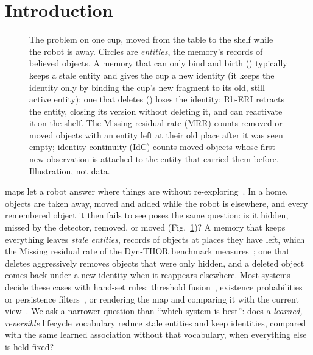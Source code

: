 \section{Introduction}
\label{sec:intro}

\begin{figure}[t]
\centering

\caption{The problem on one cup, moved from the table to the shelf while the robot is away. Circles are \emph{entities}, the memory's records of believed objects. A memory that can only bind and birth () typically keeps a stale entity and gives the cup a new identity (it keeps the identity only by binding the cup's new fragment to its old, still active entity); one that deletes () loses the identity; Rb-ERI retracts the entity, closing its version without deleting it, and can reactivate it on the shelf. The Missing residual rate (MRR) counts removed or moved objects with an entity left at their old place after it was seen empty; identity continuity (IdC) counts moved objects whose first new observation is attached to the entity that carried them before. Illustration, not data.}
\label{fig:overview}
\end{figure}

 maps let a robot answer where things are without re-exploring~\cite{fusionpp2018,conceptgraphs2024,hydra2022}.
In a home, objects are taken away, moved and added while the robot is elsewhere, and every remembered object it then fails to see poses the same question: is it hidden, missed by the detector, removed, or moved (Fig.~\ref{fig:overview})?
A memory that keeps everything leaves \emph{stale entities}, records of objects at places they have left, which the Missing residual rate of the Dyn-THOR benchmark measures~\cite{dsg2026}; one that deletes aggressively removes objects that were only hidden, and a deleted object comes back under a new identity when it reappears elsewhere.
Most systems decide these cases with hand-set rules: threshold fusion~\cite{conceptgraphs2024}, existence probabilities or persistence filters~\cite{fusionpp2018,rosen2016persistence,perpetua2025}, or rendering the map and comparing it with the current view~\cite{dsg2026,dynamicgsg2025}.
We ask a narrower question than ``which system is best'': does a \emph{learned, reversible} lifecycle vocabulary reduce stale entities and keep identities, compared with the same learned association without that vocabulary, when everything else is held fixed?

